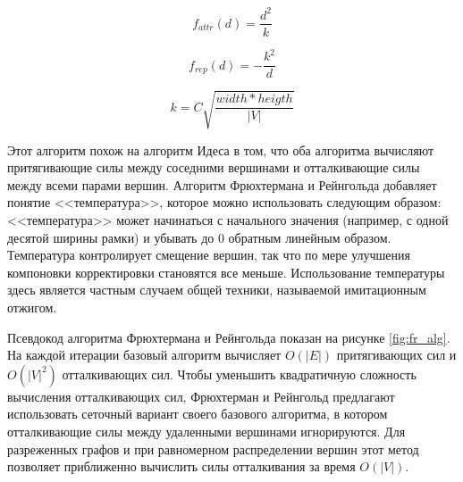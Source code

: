 \documentclass[14pt, russian]{scrartcl}
\begin{document}
\begin{equation}\label{eq:fr_attractive}
	f_{attr}(d) = \frac{d^2}{k}
\end{equation}

\begin{equation}\label{eq:fr_repulsive}
	f_{rep}(d) = -\frac{k^2}{d}
\end{equation}

\begin{equation}\label{eq:fr_const}
	k = C \sqrt{\frac{width * heigth}{|V|}}
\end{equation}


Этот алгоритм похож на алгоритм Идеса в том, что оба алгоритма вычисляют притягивающие силы между соседними вершинами и отталкивающие силы между всеми парами вершин.
Алгоритм Фрюхтермана и Рейнгольда добавляет понятие <<температура>>, которое можно использовать следующим образом: <<температура>> может начинаться с начального значения (например, с одной десятой ширины рамки) и убывать до 0 обратным линейным образом. Температура контролирует смещение вершин, так что по мере улучшения компоновки корректировки становятся все меньше. Использование температуры здесь является частным случаем общей техники, называемой имитационным отжигом.

Псевдокод алгоритма Фрюхтермана и Рейнгольда показан на рисунке \ref{fig:fr_alg}. На каждой итерации базовый алгоритм вычисляет $O(|E|)$ притягивающих сил и $O(|V|^2)$ отталкивающих сил. Чтобы уменьшить квадратичную сложность вычисления отталкивающих сил, Фрюхтерман и Рейнгольд предлагают использовать сеточный вариант своего базового алгоритма, в котором отталкивающие силы между удаленными вершинами игнорируются. Для разреженных графов и при равномерном распределении вершин этот метод позволяет приближенно вычислить силы отталкивания за время $O(|V|)$.
\end{document}

